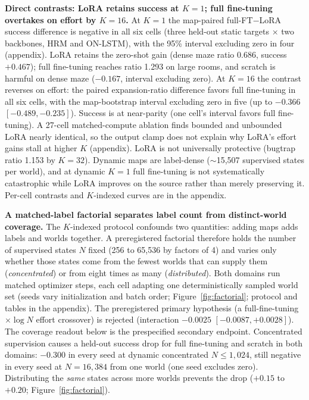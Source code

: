 \documentclass[letterpaper]{article} %
\begin{document}
\textbf{Direct contrasts: LoRA retains success at $K{=}1$; full fine-tuning overtakes on effort by $K{=}16$.} At $K{=}1$ the map-paired full-FT$-$LoRA success difference is negative in all six cells (three held-out static targets $\times$ two backbones, HRM and ON-LSTM), with the 95\% interval excluding zero in four (appendix). LoRA retains the zero-shot gain (dense maze ratio 0.686, success $+0.467$); full fine-tuning reaches ratio 1.293 on large rooms, and scratch is harmful on dense maze ($-0.167$, interval excluding zero). At $K{=}16$ the contrast reverses on effort: the paired expansion-ratio difference favors full fine-tuning in all six cells, with the map-bootstrap interval excluding zero in five (up to $-0.366$ $[-0.489,-0.235]$). Success is at near-parity (one cell's interval favors full fine-tuning). A 27-cell matched-compute ablation finds bounded and unbounded LoRA nearly identical, so the output clamp does not explain why LoRA's effort gains stall at higher $K$ (appendix). LoRA is not universally protective (bugtrap ratio 1.153 by $K{=}32$). Dynamic maps are label-dense ($\sim$15{,}507 supervised states per world), and at dynamic $K{=}1$ full fine-tuning is not systematically catastrophic while LoRA improves on the source rather than merely preserving it. Per-cell contrasts and $K$-indexed curves are in the appendix.

\textbf{A matched-label factorial separates label count from distinct-world coverage.} The $K$-indexed protocol confounds two quantities: adding maps adds labels and worlds together. A preregistered factorial therefore holds the number of supervised states $N$ fixed (256 to 65{,}536 by factors of 4) and varies only whether those states come from the fewest worlds that can supply them (\emph{concentrated}) or from eight times as many (\emph{distributed}). Both domains run matched optimizer steps, each cell adapting one deterministically sampled world set (seeds vary initialization and batch order; Figure~\ref{fig:factorial}; protocol and tables in the appendix). The preregistered primary hypothesis (a full-fine-tuning$\times\log N$ effort crossover) is rejected (interaction $-0.0025$ $[-0.0087, +0.0028]$). The coverage readout below is the prespecified secondary endpoint. Concentrated supervision causes a held-out success drop for full fine-tuning and scratch in both domains: $-0.300$ in every seed at dynamic concentrated $N \leq 1{,}024$, still negative in every seed at $N{=}16{,}384$ from one world (one seed excludes zero). Distributing the \emph{same} states across more worlds prevents the drop ($+0.15$ to $+0.20$; Figure~\ref{fig:factorial}).
\end{document}
